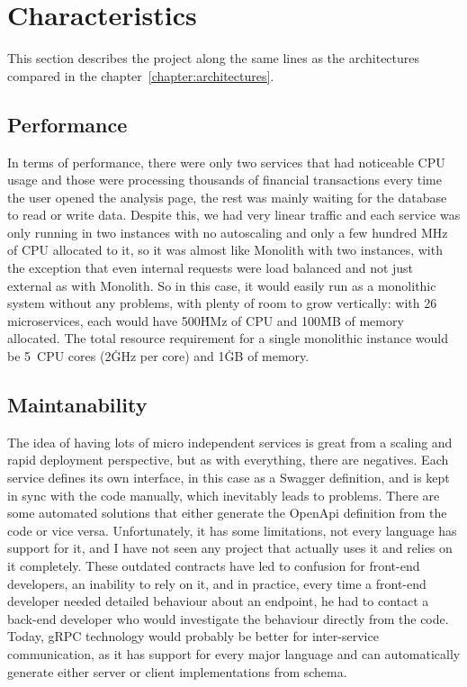 \section{Characteristics}
This section describes the project along the same lines as the architectures compared in the
chapter~\ref{chapter:architectures}.

\subsection{Performance}
In terms of performance, there were only two services that had noticeable CPU usage and those were processing thousands of financial transactions every time the user opened the analysis page, the rest was mainly waiting for the database to read or write data. Despite this, we had very linear traffic and each service was only running in two instances with no autoscaling and only a few hundred MHz of CPU allocated to it, so it was almost like Monolith with two instances, with the exception that even internal requests were load balanced and not just external as with Monolith. So in this case, it would easily run as a monolithic system without any problems, with plenty of room to grow vertically: with 26 microservices, each would have 500\.HMz of CPU and 100\.MB of memory allocated. The total resource requirement for a single monolithic instance would be 5~CPU cores (2\.GHz per core) and 1\.GB of memory.

\subsection{Maintanability}
The idea of having lots of micro independent services is great from a scaling and rapid deployment perspective, but as with everything, there are negatives. Each service defines its own interface, in this case as a Swagger definition, and is kept in sync with the code manually, which inevitably leads to problems. There are some automated solutions that either generate the OpenApi definition from the code or vice versa. Unfortunately, it has some limitations, not every language has support for it, and I have not seen any project that actually uses it and relies on it completely. These outdated contracts have led to confusion for front-end developers, an inability to rely on it, and in practice, every time a front-end developer needed detailed behaviour about an endpoint, he had to contact a back-end developer who would investigate the behaviour directly from the code. Today, gRPC technology would probably be better for inter-service communication, as it has support for every major language and can automatically generate either server or client implementations from schema.

